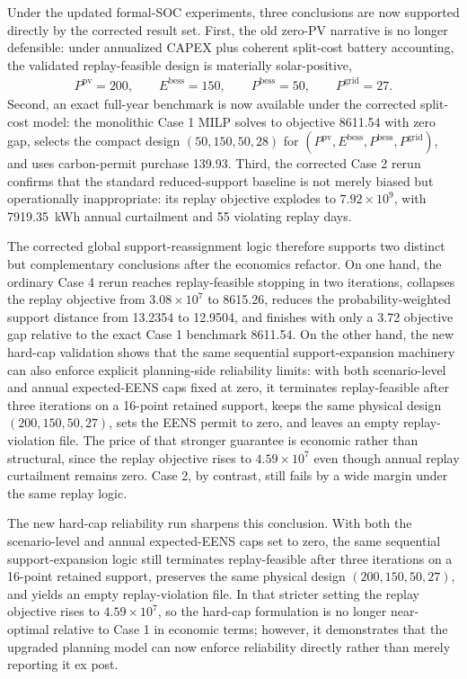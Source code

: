 Under the updated formal-SOC experiments, three conclusions are now supported directly by the corrected result set. First, the old zero-PV narrative is no longer defensible: under annualized CAPEX plus coherent split-cost battery accounting, the validated replay-feasible design is materially solar-positive,
\begin{align}
P^{\mathrm{pv}}=200,\qquad E^{\mathrm{bess}}=150,\qquad P^{\mathrm{bess}}=50,\qquad P^{\mathrm{grid}}=27.
\end{align}
Second, an exact full-year benchmark is now available under the corrected split-cost model: the monolithic Case 1 MILP solves to objective 8611.54 with zero gap, selects the compact design $(50,150,50,28)$ for $(P^{\mathrm{pv}},E^{\mathrm{bess}},P^{\mathrm{bess}},P^{\mathrm{grid}})$, and uses carbon-permit purchase 139.93. Third, the corrected Case 2 rerun confirms that the standard reduced-support baseline is not merely biased but operationally inappropriate: its replay objective explodes to $7.92\times 10^9$, with 7919.35~kWh annual curtailment and 55 violating replay days.

The corrected global support-reassignment logic therefore supports two distinct but complementary conclusions after the economics refactor. On one hand, the ordinary Case 4 rerun reaches replay-feasible stopping in two iterations, collapses the replay objective from $3.08\times 10^7$ to 8615.26, reduces the probability-weighted support distance from 13.2354 to 12.9504, and finishes with only a 3.72 objective gap relative to the exact Case 1 benchmark 8611.54. On the other hand, the new hard-cap validation shows that the same sequential support-expansion machinery can also enforce explicit planning-side reliability limits: with both scenario-level and annual expected-EENS caps fixed at zero, it terminates replay-feasible after three iterations on a 16-point retained support, keeps the same physical design $(200,150,50,27)$, sets the EENS permit to zero, and leaves an empty replay-violation file. The price of that stronger guarantee is economic rather than structural, since the replay objective rises to $4.59\times 10^7$ even though annual replay curtailment remains zero. Case 2, by contrast, still fails by a wide margin under the same replay logic.

The new hard-cap reliability run sharpens this conclusion. With both the scenario-level and annual expected-EENS caps set to zero, the same sequential support-expansion logic still terminates replay-feasible after three iterations on a 16-point retained support, preserves the same physical design $(200,150,50,27)$, and yields an empty replay-violation file. In that stricter setting the replay objective rises to $4.59\times 10^7$, so the hard-cap formulation is no longer near-optimal relative to Case 1 in economic terms; however, it demonstrates that the upgraded planning model can now enforce reliability directly rather than merely reporting it ex post.
